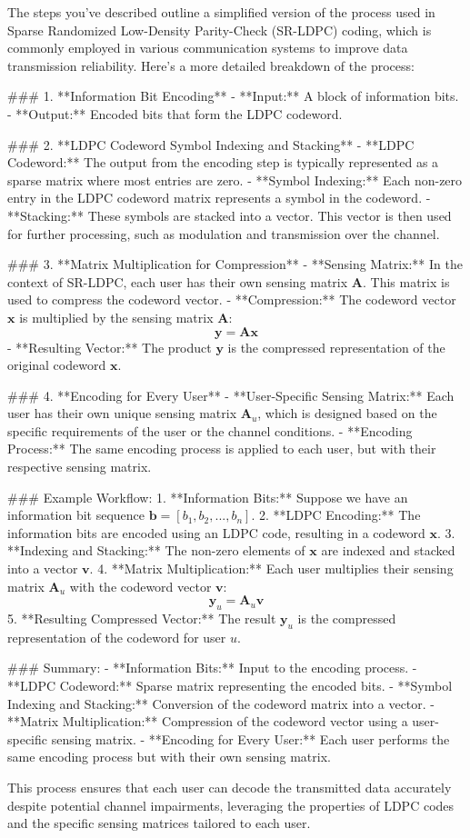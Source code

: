 The steps you've described outline a simplified version of the process used in Sparse Randomized Low-Density Parity-Check (SR-LDPC) coding, which is commonly employed in various communication systems to improve data transmission reliability. Here's a more detailed breakdown of the process:

### 1. **Information Bit Encoding**
   - **Input:** A block of information bits.
   - **Output:** Encoded bits that form the LDPC codeword.

### 2. **LDPC Codeword Symbol Indexing and Stacking**
   - **LDPC Codeword:** The output from the encoding step is typically represented as a sparse matrix where most entries are zero.
   - **Symbol Indexing:** Each non-zero entry in the LDPC codeword matrix represents a symbol in the codeword.
   - **Stacking:** These symbols are stacked into a vector. This vector is then used for further processing, such as modulation and transmission over the channel.

### 3. **Matrix Multiplication for Compression**
   - **Sensing Matrix:** In the context of SR-LDPC, each user has their own sensing matrix \( \mathbf{A} \). This matrix is used to compress the codeword vector.
   - **Compression:** The codeword vector \( \mathbf{x} \) is multiplied by the sensing matrix \( \mathbf{A} \):
     \[
     \mathbf{y} = \mathbf{A} \mathbf{x}
     \]
   - **Resulting Vector:** The product \( \mathbf{y} \) is the compressed representation of the original codeword \( \mathbf{x} \).

### 4. **Encoding for Every User**
   - **User-Specific Sensing Matrix:** Each user has their own unique sensing matrix \( \mathbf{A}_u \), which is designed based on the specific requirements of the user or the channel conditions.
   - **Encoding Process:** The same encoding process is applied to each user, but with their respective sensing matrix.

### Example Workflow:
1. **Information Bits:** Suppose we have an information bit sequence \( \mathbf{b} = [b_1, b_2, ..., b_n] \).
2. **LDPC Encoding:** The information bits are encoded using an LDPC code, resulting in a codeword \( \mathbf{x} \).
3. **Indexing and Stacking:** The non-zero elements of \( \mathbf{x} \) are indexed and stacked into a vector \( \mathbf{v} \).
4. **Matrix Multiplication:** Each user multiplies their sensing matrix \( \mathbf{A}_u \) with the codeword vector \( \mathbf{v} \):
   \[
   \mathbf{y}_u = \mathbf{A}_u \mathbf{v}
   \]
5. **Resulting Compressed Vector:** The result \( \mathbf{y}_u \) is the compressed representation of the codeword for user \( u \).

### Summary:
- **Information Bits:** Input to the encoding process.
- **LDPC Codeword:** Sparse matrix representing the encoded bits.
- **Symbol Indexing and Stacking:** Conversion of the codeword matrix into a vector.
- **Matrix Multiplication:** Compression of the codeword vector using a user-specific sensing matrix.
- **Encoding for Every User:** Each user performs the same encoding process but with their own sensing matrix.

This process ensures that each user can decode the transmitted data accurately despite potential channel impairments, leveraging the properties of LDPC codes and the specific sensing matrices tailored to each user.